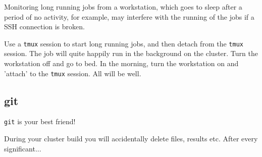 \documentclass{article}
\begin{document}
Monitoring long running jobs from a workstation, which goes to sleep after a period of no activity, for example, may interfere with the running of the jobs if a SSH connection is broken.

Use a \verb|tmux| session to start long running jobs, and then detach from the \verb|tmux| session. The job will quite happily run in the background on the cluster. Turn the workstation off and go to bed. In the morning, turn the workstation on and 'attach' to the \verb|tmux| session. All will be well.

\subsection{git}
\verb|git| is your best friend!

During your cluster build you will accidentally delete files, results etc. After every significant...
\end{document}
